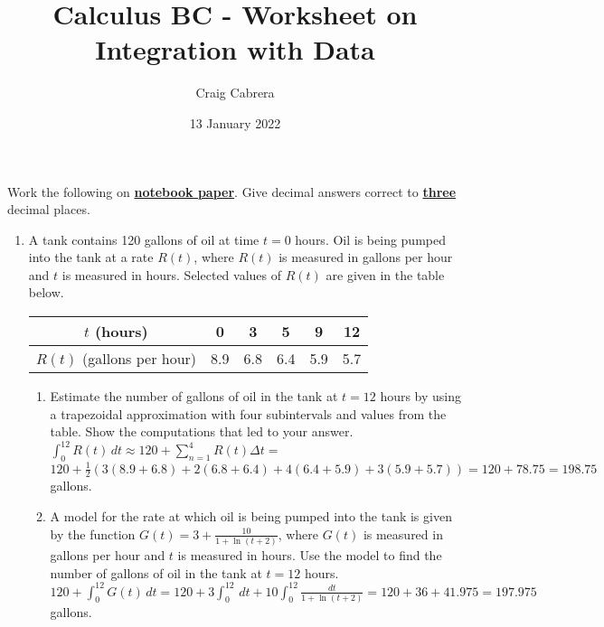 \documentclass[10pt, letterpaper]{report}
\title{Calculus BC - Worksheet on Integration with Data}
\author{Craig Cabrera}
\date{13 January 2022}
\begin{document}
\maketitle
Work the following on \textbf{\underline{notebook paper}}. Give decimal answers correct to \textbf{\underline{three}} decimal places.
\begin{enumerate}
  \item{A tank contains 120 gallons of oil at time $t=0$ hours. Oil is being pumped into the tank at a rate $R(t)$, where $R(t)$ is measured in gallons per hour and $t$ is measured in hours. Selected values of $R(t)$ are given in the table below.
  \begin{center}
    \begin{tabular}{| c | c | c | c | c | c |}
      \hline
      $t$ (hours) & 0 & 3 & 5 & 9 & 12 \\
      \hline
      $R(t)$ (gallons per hour) & 8.9 & 6.8 & 6.4 & 5.9 & 5.7 \\
      \hline
    \end{tabular}
  \end{center}}
  \begin{enumerate}
    \item{Estimate the number of gallons of oil in the tank at $t=12$ hours by using a trapezoidal approximation with four subintervals and values from the table. Show the computations that led to your answer.} \\

      $\int_{0}^{12}{R(t)}\,dt\approx120+\sum_{n=1}^{4}{R(t)\Delta t}= $ \\

      $120+\frac{1}{2}\left(3(8.9+6.8)+2(6.8+6.4)+4(6.4+5.9)+3(5.9+5.7)\right)=
      120+78.75=198.75$ gallons. \\

    \item{A model for the rate at which oil is being pumped into the tank is given by the function $G(t)=3+\frac{10}{1+\ln{(t+2)}}$, where $G(t)$ is measured in gallons per hour and $t$ is measured in hours. Use the model to find the number of gallons of oil in the tank at $t=12$ hours. } \\

      $120+\int_{0}^{12}{G(t)}\,dt=
      120+3\int_{0}^{12}{}\,dt+10\int_{0}^{12}{\frac{dt}{1+\ln{(t+2)}}}=
      120+36+41.975=197.975$ gallons. \\


\end{enumerate}
\end{enumerate}
\end{document}
